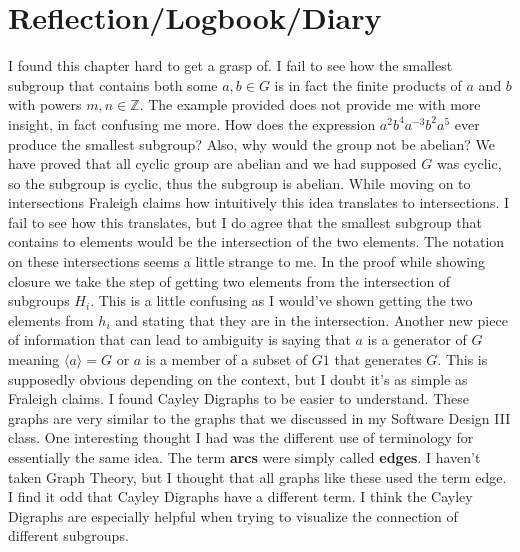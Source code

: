 \documentclass[11pt]{article}
\theoremstyle{plain}
\theoremstyle{definition}
\newcommand{\Z}{\mathbb{Z}}
\begin{document}
\section{Reflection/Logbook/Diary}
	I found this chapter hard to get a grasp of. I fail to see how the smallest subgroup that contains both some $ a,b \in G $ is in fact the finite products of $ a $ and $ b $ with powers $ m,n \in \Z $. The example provided does not provide me with more insight, in fact confusing me more. How does the expression $ a^2b^4a^{-3}b^2a^5 $ ever produce the smallest subgroup? Also, why would the group not be abelian? We have proved that all cyclic group are abelian and we had supposed $ G $ was cyclic, so the subgroup is cyclic, thus the subgroup is abelian. While moving on to intersections Fraleigh claims how intuitively this idea translates to intersections. I fail to see how this translates, but I do agree that the smallest subgroup that contains to elements would be the intersection of the two elements. The notation on these intersections seems a little strange to me. In the proof while showing closure we take the step of getting two elements from the intersection of subgroups $ H_i $. This is a little confusing as I would've shown getting the two elements from $ h_i $ and stating that they are in the intersection. Another new piece of information that can lead to ambiguity is saying that $ a $ is a generator of $ G $ meaning $ \langle a \rangle = G $ or $ a $ is a member of a subset of $ G 1$ that generates $ G $. This is supposedly obvious depending on the context, but I doubt it's as simple as Fraleigh claims. I found Cayley Digraphs to be easier to understand. These graphs are very similar to the graphs that we discussed in my Software Design III class. One interesting thought I had was the different use of terminology for essentially the same idea. The term \textbf{arcs} were simply called \textbf{edges}. I haven't taken Graph Theory, but I thought that all graphs like these used the term edge. I find it odd that Cayley Digraphs have a different term. I think the Cayley Digraphs are especially helpful when trying to visualize the connection of different subgroups.
\end{document}
